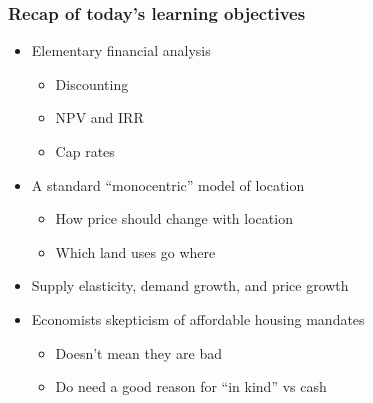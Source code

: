 \documentclass{beamer}
\begin{document}
\begin{frame}
\frametitle{Recap of today's learning objectives}
\begin{itemize}
	\item Elementary financial analysis
		\begin{itemize}
			\item Discounting
			\item NPV and IRR
			\item Cap rates
		\end{itemize}
	\item A standard ``monocentric'' model of location
		\begin{itemize}
			\item How price should change with location
			\item Which land uses go where
		\end{itemize}
	\item Supply elasticity, demand growth, and price growth
	\item Economists skepticism of affordable housing mandates
		\begin{itemize}
			\item Doesn't mean they are bad
			\item Do need a good reason for ``in kind'' vs cash
		\end{itemize}
\end{itemize}
\end{frame}
\end{document}
